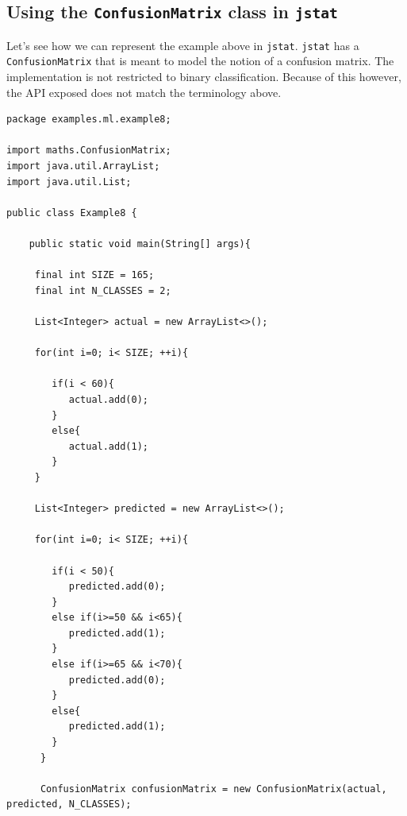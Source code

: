 \subsection{Using the \texttt{ConfusionMatrix} class in \texttt{jstat}}

Let's see how we can represent the example above in \texttt{jstat}.
\texttt{jstat} has a \texttt{ConfusionMatrix} that is meant to model
the notion of a confusion matrix. The implementation is not restricted to binary classification.
Because of this however, the API exposed does not match the terminology above. 


\begin{verbatim}
package examples.ml.example8;

import maths.ConfusionMatrix;
import java.util.ArrayList;
import java.util.List;

public class Example8 {

    public static void main(String[] args){

     final int SIZE = 165;
     final int N_CLASSES = 2;

     List<Integer> actual = new ArrayList<>();

     for(int i=0; i< SIZE; ++i){

        if(i < 60){
           actual.add(0);
        }
        else{
           actual.add(1);
        }
     }

     List<Integer> predicted = new ArrayList<>();

     for(int i=0; i< SIZE; ++i){

        if(i < 50){
           predicted.add(0);
        }
        else if(i>=50 && i<65){
           predicted.add(1);
        }
        else if(i>=65 && i<70){
           predicted.add(0);
        }
        else{
           predicted.add(1);
        }
      }

      ConfusionMatrix confusionMatrix = new ConfusionMatrix(actual, predicted, N_CLASSES);


\end{verbatim}
